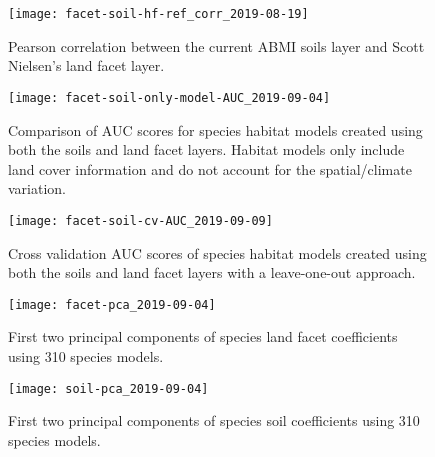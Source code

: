 \documentclass[12pt]{article}
\begin{document}
\begin{figure}[!htb]
\texttt{[image: facet-soil-hf-ref\_corr\_2019-08-19]}
\caption{Pearson correlation between the current ABMI soils layer and Scott Nielsen’s land facet layer.}
\centering
\label{fig:Corr}
\end{figure}

\begin{figure}[!htb]
\texttt{[image: facet-soil-only-model-AUC\_2019-09-04]}
\caption{Comparison of AUC scores for species habitat models created using both the soils and land facet layers. Habitat models only include land cover information and do not account for the spatial/climate variation.}
\centering
\label{fig:AUC}
\end{figure}

\begin{figure}[!htb]
\texttt{[image: facet-soil-cv-AUC\_2019-09-09]}
\caption{Cross validation AUC scores of species habitat models created using both the soils and land facet layers with a leave-one-out approach.}
\centering
\label{fig:CV}
\end{figure}

\begin{figure}[!htb]
\texttt{[image: facet-pca\_2019-09-04]}
\caption{First two principal components of species land facet coefficients using 310 species models.}
\centering
\label{fig:facetPCA}
\end{figure}

\begin{figure}[!htb]
\texttt{[image: soil-pca\_2019-09-04]}
\caption{First two principal components of species soil coefficients using 310 species models.}
\centering
\label{fig:SoilPCA}
\end{figure}
\end{document}
